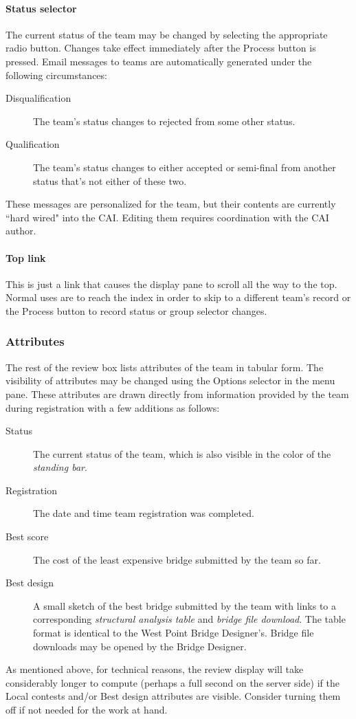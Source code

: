 \documentclass[11pt,letterpaper]{refart}
\def\ui#1{\textsf{#1}}
\begin{document}
\paragraph{Status selector}
The current status of the team may be changed by selecting the appropriate
radio button.  Changes take effect immediately after the \ui{Process} button is
pressed. Email messages to teams are automatically generated under the 
following circumstances:
\begin{description}
\item[Disqualification] The team's status changes to 
rejected from some other status.
\item[Qualification] The team's status changes to either accepted or
semi-final from another status that's not either of these two.
\end{description}
These messages are personalized for the team, but their contents are currently
``hard wired" into the CAI.  Editing them requires coordination with the CAI 
author.

\paragraph{Top link}
This is just a link that causes the display pane to scroll all the way to the top.
Normal uses are to reach the index in order to skip to a different team's record
or the \ui{Process} button to record status or group selector changes.

\subsubsection{Attributes}
The rest of the review box lists attributes of the team in tabular form. The visibility of attributes
may be changed using the \ui{Options} selector in the menu pane.  These attributes
are drawn directly from information provided by the team during registration with a few additions
as follows:
\begin{description}
\item[Status] The current status of the team, which is also visible in the 
color of the \emph{standing bar}.
\item[Registration] The date and time team registration was completed.
\item[Best score] The cost of the least expensive bridge submitted by the team so far.
\item[Best design] A small sketch of the best bridge submitted by the team with links
to a corresponding \emph{structural analysis table} and \emph{bridge file download}.
The table format is identical to the West Point Bridge Designer's.  Bridge file downloads 
may be opened by the Bridge Designer.
\end{description}
As mentioned above, for technical reasons, the review display will take considerably 
longer to compute (perhaps a full second on the server side) if the \ui{Local contests}  
and/or  \ui{Best design} attributes are visible.  Consider turning them off if not needed
for the work at hand.
\end{document}
